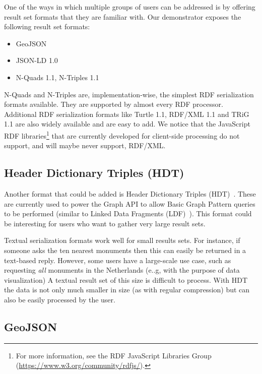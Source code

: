 \documentclass[a4paper]{scrartcl}
\begin{document}
One of the ways in which multiple groups of users can be addressed is
by offering result set formats that they are familiar with.  Our
demonstrator exposes the following result set formats:

\begin{itemize}

\item GeoJSON

\item JSON-LD 1.0

\item N-Quads 1.1, N-Triples 1.1

\end{itemize}

N-Quads and N-Triples are, implementation-wise, the simplest RDF
serialization formats available.  They are supported by almost every
RDF processor.  Additional RDF serialization formats like Turtle 1.1,
RDF/XML 1.1 and TRiG 1.1 are also widely available and are easy to
add.  We notice that the JavaScript RDF libraries\footnote{For more
  information, see the RDF JavaScript Libraries Group
  (\url{https://www.w3.org/community/rdfjs/}).} that are currently
developed for client-side processing do not support, and will maybe
never support, RDF/XML.


\subsection{Header Dictionary Triples (HDT)}
\label{sec:hdt}

Another format that could be added is Header Dictionary Triples
(HDT)~\cite{Fernandez2013}.  These are currently used to power the
Graph API to allow Basic Graph Pattern queries to be performed
(similar to Linked Data Fragments (LDF)~\cite{Verborgh2014}).  This
format could be interesting for users who want to gather very large
result sets.

Textual serialization formats work well for small results sets.  For
instance, if someone asks the ten nearest monuments then this can
easily be returned in a text-based reply.  However, some users have a
large-scale use case, such as requesting \emph{all} monuments in the
Netherlands (e..g, with the purpose of data visualization) A textual
result set of this size is difficult to process.  With HDT the data is
not only much smaller in size (as with regular compression) but can
also be easily processed by the user.


\subsection{GeoJSON}
\label{sec:geojson}
\end{document}

